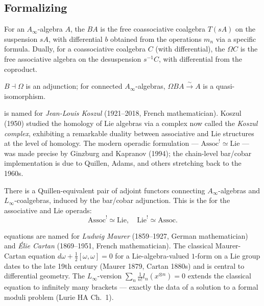 \subsection{Formalizing}

\begin{definition}
\label{def:bar-cobar}
For an $A_\infty$-algebra $A$, the  $B A$ is the
free coassociative coalgebra $T(s A)$ on the suspension $s A$, with
differential $b$ obtained from the operations $m_n$ via a specific
formula. Dually, for a coassociative coalgebra $C$ (with differential),
the  $\Omega C$ is the free associative algebra
on the desuspension $s^{-1} C$, with differential from the coproduct.

$B \dashv \Omega$ is an adjunction; for connected $A_\infty$-algebras,
$\Omega B A \xrightarrow{\sim} A$ is a quasi-isomorphism.
\end{definition}

\begin{nameorigin}
 is named for \emph{Jean-Louis Koszul} (1921--2018,
French mathematician). Koszul (1950) studied the homology of Lie
algebras via a complex now called the \emph{Koszul complex}, exhibiting
a remarkable duality between associative and Lie structures at the
level of homology. The modern operadic formulation —
$\mathrm{Assoc}^! \simeq \mathrm{Lie}$ — was made precise by Ginzburg
and Kapranov (1994); the chain-level bar/cobar implementation is due to
Quillen, Adams, and others stretching back to the 1960s.
\end{nameorigin}

\begin{theorem}
\label{thm:koszul-duality-Ainf-Linf}
There is a Quillen-equivalent pair of adjoint functors connecting
$A_\infty$-algebras and $L_\infty$-coalgebras, induced by the
bar/cobar adjunction. This is the  for the
associative and Lie operads:
\begin{equation*}
  \mathrm{Assoc}^! \simeq \mathrm{Lie}, \quad \mathrm{Lie}^! \simeq \mathrm{Assoc}.
\end{equation*}
\end{theorem}

\begin{nameorigin}
 equations are named for \emph{Ludwig Maurer}
(1859--1927, German mathematician) and \emph{Élie Cartan}
(1869--1951, French mathematician). The classical
Maurer-Cartan equation $d\omega + \tfrac12 [\omega, \omega] = 0$ for
a Lie-algebra-valued $1$-form on a Lie group dates to the late 19th
century (Maurer 1879, Cartan 1880s) and is central to differential
geometry. The $L_\infty$-version $\sum_n \tfrac1{n!} l_n(x^{\otimes n}) = 0$
extends the classical equation to infinitely many brackets — exactly
the data of a solution to a formal moduli problem (Lurie HA Ch.~1).
\end{nameorigin}

